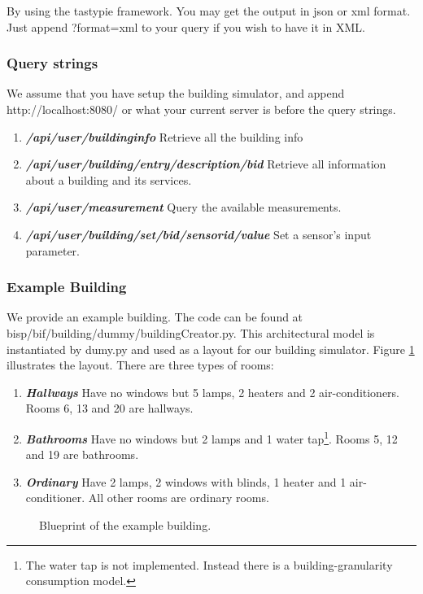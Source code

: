 \documentclass[10pt]{article}
\newcommand{\includeSVG}[1]{
  \texttt{[image: figs/\#1.pdf]}
}
\newcommand{\textdesc}[1]{\textit{\textbf{#1}}} %
\newcommand{\descitem}[1]{\item \textdesc{#1}}
\begin{document}
By using the tastypie framework. You may get the output in json or xml format. Just append
?format=xml to your query if you wish to have it in XML.

\subsubsection{Query strings}
We assume that you have setup the building simulator, and append http://localhost:8080/ or what your
current server is before the query strings.

\begin{enumerate}
				\descitem{/api/user/buildinginfo} Retrieve all the building info
				\descitem{/api/user/building/entry/description/bid} Retrieve all information about a
				building and its services.
				\descitem{/api/user/measurement} Query the available measurements.
				\descitem{/api/user/building/set/bid/sensorid/value} Set a sensor's input parameter.
\end{enumerate}

\subsubsection{Example Building}

We provide an example building. The code can be found at bisp/bif/building/dummy/buildingCreator.py. This architectural model is instantiated by dumy.py and used as a layout for our building simulator. Figure \ref{fig:building:example} illustrates the layout. There are three types of rooms:
\begin{enumerate}
  \descitem{Hallways} Have no windows but 5 lamps, 2 heaters and 2 air-conditioners. Rooms 6, 13 and 20 are hallways.
  \descitem{Bathrooms} Have no windows but 2 lamps and 1 water tap\footnote{The water tap is not implemented. Instead there is a building-granularity consumption model.}. Rooms 5, 12 and 19 are bathrooms.
  \descitem{Ordinary} Have 2 lamps, 2 windows with blinds, 1 heater and 1 air-conditioner. All other rooms are ordinary rooms.
\end{enumerate}

\begin{figure}[htbp]
  \begin{center}
    \rotatebox{0}{\scalebox{1.0}{\includeSVG{building0}}}
  \end{center}
  \caption{Blueprint of the example building.}
  \label{fig:building:example}
\end{figure}
\end{document}
